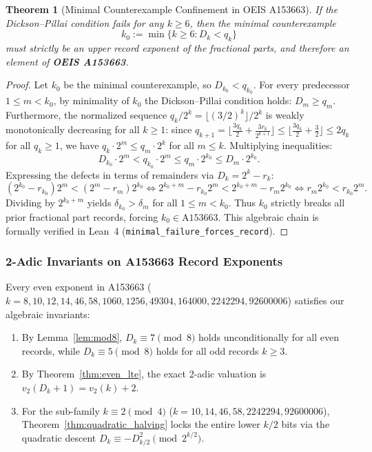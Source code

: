 \documentclass[11pt,reqno]{amsart}
\newtheorem{theorem}{Theorem}[section]
\theoremstyle{definition}
\numberwithin{equation}{section}
\begin{document}
\begin{theorem}[Minimal Counterexample Confinement in OEIS A153663]\label{thm:minimal_failure_record}
If the Dickson--Pillai condition fails for any $k \ge 6$, then the minimal counterexample
\begin{equation}
k_0 := \min \{ k \ge 6 : D_k < q_k \}
\end{equation}
must strictly be an upper record exponent of the fractional parts, and therefore an element of \textbf{OEIS A153663}.
\end{theorem}

\begin{proof}
Let $k_0$ be the minimal counterexample, so $D_{k_0} < q_{k_0}$. For every predecessor $1 \le m < k_0$, by minimality of $k_0$ the Dickson--Pillai condition holds: $D_m \ge q_m$.
Furthermore, the normalized sequence $q_k / 2^k = \lfloor (3/2)^k \rfloor / 2^k$ is weakly monotonically decreasing for all $k \ge 1$: since $q_{k+1} = \lfloor \frac{3 q_k}{2} + \frac{3 r_k}{2^{k+1}} \rfloor \le \lfloor \frac{3 q_k}{2} + \frac{3}{2} \rfloor \le 2 q_k$ for all $q_k \ge 1$, we have $q_k \cdot 2^m \le q_m \cdot 2^k$ for all $m \le k$.
Multiplying inequalities:
\[
D_{k_0} \cdot 2^m < q_{k_0} \cdot 2^m \le q_m \cdot 2^{k_0} \le D_m \cdot 2^{k_0}.
\]
Expressing the defects in terms of remainders via $D_k = 2^k - r_k$:
\[
(2^{k_0} - r_{k_0}) 2^m < (2^m - r_m) 2^{k_0} \iff 2^{k_0 + m} - r_{k_0} 2^m < 2^{k_0 + m} - r_m 2^{k_0} \iff r_m 2^{k_0} < r_{k_0} 2^m.
\]
Dividing by $2^{k_0 + m}$ yields $\delta_{k_0} > \delta_m$ for all $1 \le m < k_0$. Thus $k_0$ strictly breaks all prior fractional part records, forcing $k_0 \in \text{A153663}$.
This algebraic chain is formally verified in Lean~4 (\texttt{minimal\_failure\_forces\_record}).
\end{proof}

\subsubsection{2-Adic Invariants on A153663 Record Exponents}
Every even exponent in A153663 ($k = 8, 10, 12, 14, 46, 58, 1060, 1256, 49304, 164000, 2242294, 92600006$) satisfies our algebraic invariants:
\begin{enumerate}
    \item By Lemma~\ref{lem:mod8}, $D_k \equiv 7 \pmod 8$ holds unconditionally for all even records, while $D_k \equiv 5 \pmod 8$ holds for all odd records $k \ge 3$.
    \item By Theorem~\ref{thm:even_lte}, the exact 2-adic valuation is $v_2(D_k + 1) = v_2(k) + 2$.
    \item For the sub-family $k \equiv 2 \pmod 4$ ($k = 10, 14, 46, 58, 2242294, 92600006$), Theorem~\ref{thm:quadratic_halving} locks the entire lower $k/2$ bits via the quadratic descent $D_k \equiv -D_{k/2}^2 \pmod{2^{k/2}}$.
\end{enumerate}
\end{document}
